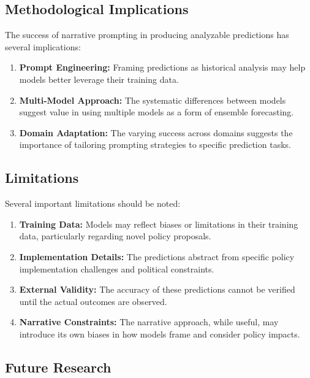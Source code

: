 \subsection{Methodological Implications}

The success of narrative prompting in producing analyzable predictions has several implications:

\begin{enumerate}
    \item \textbf{Prompt Engineering:} Framing predictions as historical analysis may help models better leverage their training data.
    
    \item \textbf{Multi-Model Approach:} The systematic differences between models suggest value in using multiple models as a form of ensemble forecasting.
    
    \item \textbf{Domain Adaptation:} The varying success across domains suggests the importance of tailoring prompting strategies to specific prediction tasks.
\end{enumerate}

\subsection{Limitations}

Several important limitations should be noted:

\begin{enumerate}
    \item \textbf{Training Data:} Models may reflect biases or limitations in their training data, particularly regarding novel policy proposals.
    
    \item \textbf{Implementation Details:} The predictions abstract from specific policy implementation challenges and political constraints.
    
    \item \textbf{External Validity:} The accuracy of these predictions cannot be verified until the actual outcomes are observed.
    
    \item \textbf{Narrative Constraints:} The narrative approach, while useful, may introduce its own biases in how models frame and consider policy impacts.
\end{enumerate}

\subsection{Future Research}

